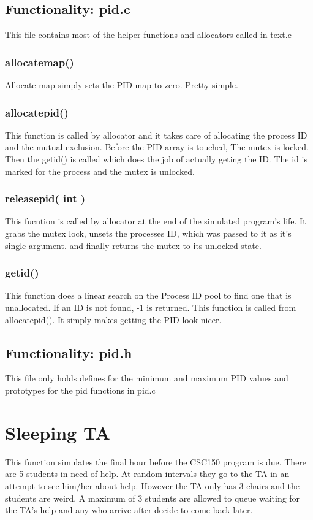 \documentclass[11pt]{article}
\begin{document}
\subsection{ Functionality: pid.c}
This file contains most of the helper functions and allocators called in text.c

\subsubsection{ allocate\textunderscore map()}
Allocate map simply sets the PID map to zero. Pretty simple.

\subsubsection{ allocate\textunderscore pid()}
This function is called by allocator and it takes care of allocating the process ID and the mutual exclusion. Before the PID array is touched, The mutex is locked. Then the get\textunderscore id() is called which does the job of actually geting the ID. The id is marked for the process and the mutex is unlocked.

\subsubsection { release\textunderscore pid( int )}
This fucntion is called by allocator at the end of the simulated program's life. It grabs the mutex lock, unsets the processes ID, which was passed to it as it's single argument. and finally returns the mutex to its unlocked state.

\subsubsection{get\textunderscore id()}
This function does a linear search on the Process ID pool to find one that is unallocated. If an ID is not found, -1 is returned. This function is called from allocate\textunderscore pid(). It simply makes getting the PID look nicer.

\subsection{ Functionality: pid.h}
This file only holds defines for the minimum and maximum PID values and prototypes for the pid functions in pid.c

\pagebreak

\section{Sleeping TA}
This function simulates the final hour before the CSC150 program is due. There are 5 students in need of help. At random intervals they go to the TA in an attempt to see him/her about help. However the TA only has 3 chairs and the students are weird. A maximum of 3 students are allowed to queue waiting for the TA's help and any who arrive after decide to come back later.
\end{document}
